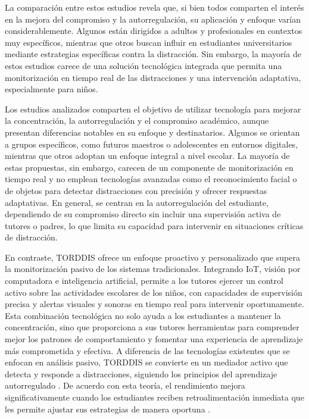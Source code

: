 \documentclass[a4paper,fleqn]{cas-sc}
\begin{document}
	La comparación entre estos estudios revela que, si bien todos comparten el interés en la mejora del compromiso y la autorregulación, su aplicación y enfoque varían considerablemente. Algunos están dirigidos a adultos y profesionales en contextos muy específicos, mientras que otros buscan influir en estudiantes universitarios mediante estrategias específicas contra la distracción. Sin embargo, la mayoría de estos estudios carece de una solución tecnológica integrada que permita una monitorización en tiempo real de las distracciones y una intervención adaptativa, especialmente para niños.
	
	
	Los estudios analizados comparten el objetivo de utilizar tecnología para mejorar la concentración, la autorregulación y el compromiso académico, aunque presentan diferencias notables en su enfoque y destinatarios. Algunos se orientan a grupos específicos, como futuros maestros o adolescentes en entornos digitales, mientras que otros adoptan un enfoque integral a nivel escolar. La mayoría de estas propuestas, sin embargo, carecen de un componente de monitorización en tiempo real y no emplean tecnologías avanzadas como el reconocimiento facial o de objetos para detectar distracciones con precisión y ofrecer respuestas adaptativas. En general, se centran en la autorregulación del estudiante, dependiendo de su compromiso directo sin incluir una supervisión activa de tutores o padres, lo que limita su capacidad para intervenir en situaciones críticas de distracción.
	
	En contraste, TORDDIS ofrece un enfoque proactivo y personalizado que supera la monitorización pasivo de los sistemas tradicionales. Integrando IoT, visión por computadora e inteligencia artificial, permite a los tutores ejercer un control activo sobre las actividades escolares de los niños, con capacidades de supervisión precisa y alertas visuales y sonoras en tiempo real para intervenir oportunamente. Esta combinación tecnológica no solo ayuda a los estudiantes a mantener la concentración, sino que proporciona a sus tutores herramientas para comprender mejor los patrones de comportamiento y fomentar una experiencia de aprendizaje más comprometida y efectiva. A diferencia de las tecnologías existentes que se enfocan en análisis pasivo, TORDDIS se convierte en un mediador activo que detecta y responde a distracciones, siguiendo los principios del aprendizaje autorregulado \citep{NG201865}. De acuerdo con esta teoría, el rendimiento mejora significativamente cuando los estudiantes reciben retroalimentación inmediata que les permite ajustar sus estrategias de manera oportuna \citep{Taber2024Developing}.
	
\end{document}
